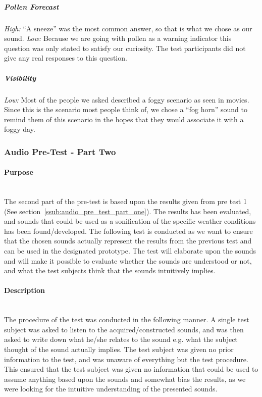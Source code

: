 \subparagraph{Pollen Forecast} %
\label{subp:pollen_forecast}
\emph{High:} \enquote{A sneeze} was the most common answer, so that is what we chose as our sound.
\emph{Low:} Because we are going with pollen as a warning indicator this question was only stated to satisfy our curiosity. 
The test participants did not give any real responses to this question. 

\subparagraph{Visibility} %
\label{subp:visibility}
\emph{Low:} Most of the people we asked described a foggy scenario as seen in movies. 
Since this is the scenario most people think of, we chose a \enquote{fog horn} sound to remind them of this scenario in the hopes that they would associate it with a foggy day.




\subsubsection{Audio Pre-Test - Part Two} %
\label{ssub:audio_pre_test_part_two}

\paragraph{Purpose} %
\label{par:pre_test_2_purpose}
\hspace{0pt} \\
The second part of the pre-test is based upon the results given from pre test 1 (See section~\ref{ssub:audio_pre_test_part_one}). 
The results has been evaluated, and sounds that could be used as a sonification of the specific weather conditions has been found/developed. 
The following test is conducted as we want to ensure that the chosen sounds actually represent the results from the previous test and can be used in the designated prototype. 
The test will elaborate upon the sounds and will make it possible to evaluate whether the sounds are understood or not, and what the test subjects think that the sounds intuitively implies.

\paragraph{Description} %
\label{par:pre_test_2_description}
\hspace{0pt} \\
The procedure of the test was conducted in the following manner. 
A single test subject was asked to listen to the acquired/constructed sounds, and was then asked to write down what he/she relates to the sound e.g. what the subject thought of the sound actually implies. 
The test subject was given no prior information to the test, and was unaware of everything but the test procedure.
This ensured that the test subject was given no information that could be used to assume anything based upon the sounds and somewhat bias the results, as we were looking for the intuitive understanding of the presented sounds.

